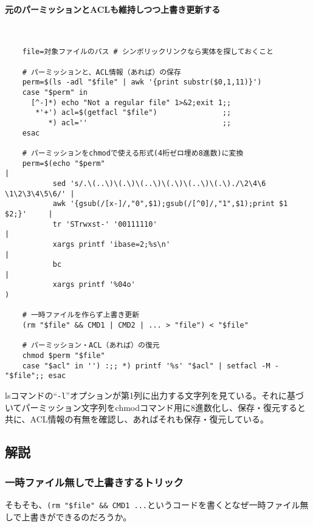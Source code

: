 \paragraph{元のパーミッションとACLも維持しつつ上書き更新する} 　\\
\begin{frameboxit}{160.0mm}
\begin{verbatim}
	file=対象ファイルのパス # シンボリックリンクなら実体を探しておくこと

	# パーミッションと、ACL情報（あれば）の保存
	perm=$(ls -adl "$file" | awk '{print substr($0,1,11)}')
	case "$perm" in
	  [^-]*) echo "Not a regular file" 1>&2;exit 1;;
	   *'+') acl=$(getfacl "$file")               ;;
	      *) acl=''                               ;;
	esac

	# パーミッションをchmodで使える形式(4桁ゼロ埋め8進数)に変換
	perm=$(echo "$perm"                                                     |
	       sed 's/.\(..\)\(.\)\(..\)\(.\)\(..\)\(.\)./\2\4\6 \1\2\3\4\5\6/' |
	       awk '{gsub(/[x-]/,"0",$1);gsub(/[^0]/,"1",$1);print $1 $2;}'     |
	       tr 'STrwxst-' '00111110'                                         |
	       xargs printf 'ibase=2;%s\n'                                      |
	       bc                                                               |
	       xargs printf '%04o'                                              )

	# 一時ファイルを作らず上書き更新
	(rm "$file" && CMD1 | CMD2 | ... > "file") < "$file"

	# パーミッション・ACL（あれば）の復元
	chmod $perm "$file"
	case "$acl" in '') :;; *) printf '%s' "$acl" | setfacl -M - "$file";; esac
\end{verbatim}
\end{frameboxit}
lsコマンドの``\verb|-l|''オプションが第1列に出力する文字列を見ている。それに基づいてパーミッション文字列をchmodコマンド用に8進数化し、保存・復元すると共に、ACL情報の有無を確認し、あればそれも保存・復元している。

\subsection*{解説}

\subsubsection*{一時ファイル無しで上書きするトリック}

そもそも、\verb!(rm "$file" && CMD1 ...!というコードを書くとなぜ一時ファイル無しで上書きができるのだろうか。

